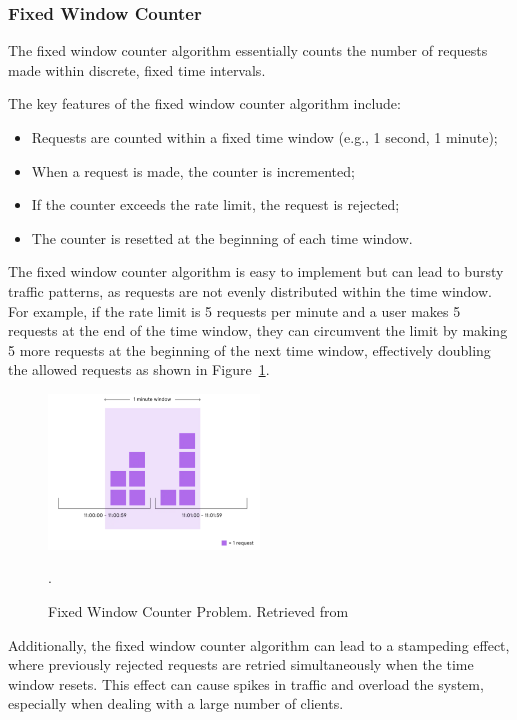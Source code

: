 \subsubsection{Fixed Window Counter}\label{subsubsec:fixed-window-counter-algorithm}

The fixed window counter algorithm essentially counts the number of requests made within discrete,
fixed time intervals.

The key features of the fixed window counter algorithm include:

\begin{itemize}
    \item Requests are counted within a fixed time window (e.g., 1 second, 1 minute);
    \item When a request is made, the counter is incremented;
    \item If the counter exceeds the rate limit, the request is rejected;
    \item The counter is resetted at the beginning of each time window.
\end{itemize}

The fixed window counter algorithm is easy to implement but can lead to bursty traffic patterns, as requests are not evenly distributed within the time window.
For example, if the rate limit is 5 requests per minute and a user makes 5 requests at the end of the time window, they can circumvent the limit by making 5 more requests at the beginning of the next time window, effectively doubling the allowed requests as shown in Figure~\ref{fig:fixed-window-counter-problem}.

\begin{figure}[!htb]
    \centering
    \includegraphics[width=0.5\textwidth]{../figures/06_fixed-window-counter-problem}
    \caption{Fixed Window Counter Problem.
    Retrieved from~\cite{medium-rate-limiting-algorithms}}.
    \label{fig:fixed-window-counter-problem}
\end{figure}

Additionally, the fixed window counter algorithm can lead to a stampeding effect,
where previously rejected requests are retried simultaneously when the time window resets.
This effect can cause spikes in traffic and overload the system, especially when dealing with a large number of clients.

